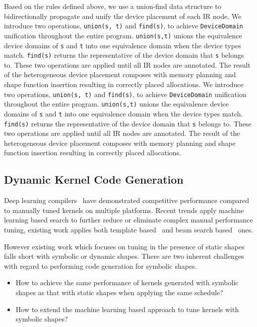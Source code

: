 Based on the rules defined above, we use a union-find data structure to bidirectionally propagate and unify the device placement of each IR node. We introduce two operations, \texttt{union(s, t)} and \texttt{find(s)}, to achieve \texttt{DeviceDomain} unification throughout the entire program. \texttt{union(s,t)} unions the equivalence device domains of \texttt{s} and \texttt{t} into one equivalence domain when the device types match. \texttt{find(s)} returns the representative of the device domain that \texttt{s} belongs to. These two operations are applied until all IR nodes are annotated. The result of the heterogeneous device placement composes with memory planning and shape function insertion resulting in correctly placed allocations.
We introduce two operations, \texttt{union(s, t)} and \texttt{find(s)}, to achieve \texttt{DeviceDomain} unification throughout the entire program.
\texttt{union(s,t)} unions the equivalence device domains of \texttt{s} and \texttt{t} into one equivalence domain when the device types match.
\texttt{find(s)} returns the representative of the device domain that \texttt{s} belongs to.
These two operations are applied until all IR nodes are annotated.
The result of the heterogeneous device placement composes with memory planning and shape function insertion resulting in
correctly placed allocations.

\subsection{Dynamic Kernel Code Generation}
\label{sec:compliation:codegen}
Deep learning compilers~\citep{tvm_osdi18, halide} have demonstrated competitive performance compared to manually
  tuned kernels on multiple platforms.
Recent trends apply machine learning based search to further reduce or eliminate complex manual performance tuning,
  existing work applies both template based~\citep{chen2018learning, zheng2020flextensor} and beam search based~\citep{adams2019learning} ones.

However existing work which focuses on tuning in the presence of static shapes falls short with symbolic or dynamic shapes.
There are two inherent challenges with regard to performing code generation for symbolic shapes.
\begin{itemize}
    \item How to achieve the same performance of kernels generated with symbolic shapes as that with static shapes when applying the same schedule?
    \item How to extend the machine learning based approach to tune kernels with symbolic shapes?
\end{itemize}

